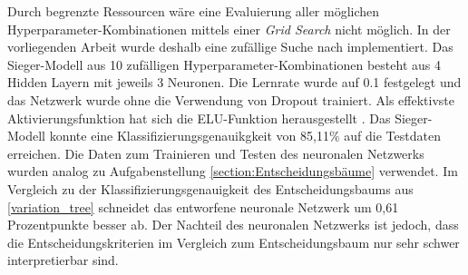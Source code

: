 Durch begrenzte Ressourcen wäre eine Evaluierung aller möglichen Hyperparameter-Kombinationen mittels einer \emph{Grid Search} nicht möglich. In der vorliegenden Arbeit wurde deshalb eine zufällige Suche nach \cite{randomSearch} implementiert. Das Sieger-Modell aus 10 zufälligen Hyperparameter-Kombinationen besteht aus 4 Hidden Layern mit jeweils 3 Neuronen. Die Lernrate wurde auf 0.1 festgelegt und das Netzwerk wurde ohne die Verwendung von Dropout trainiert. Als effektivste Aktivierungsfunktion hat sich die ELU-Funktion herausgestellt \cite{elu}. Das Sieger-Modell konnte eine Klassifizierungsgenauikgkeit von 85,11\% auf die Testdaten erreichen. Die Daten zum Trainieren und Testen des neuronalen Netzwerks wurden analog zu Aufgabenstellung \ref{section:Entscheidungsbäume} verwendet. Im Vergleich zu der Klassifizierungsgenauigkeit des Entscheidungsbaums aus \ref{variation_tree} schneidet das entworfene neuronale Netzwerk um 0,61 Prozentpunkte besser ab. Der Nachteil des neuronalen Netzwerks ist jedoch, dass die Entscheidungskriterien im Vergleich zum Entscheidungsbaum nur sehr schwer interpretierbar sind.
